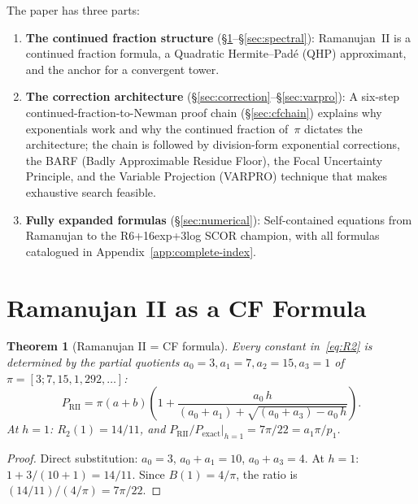 \documentclass[12pt]{article}
\newtheorem{theorem}{Theorem}[section]
\begin{document}
The paper has three parts:
\begin{enumerate}
\item \textbf{The continued fraction structure} (\S\ref{sec:R2}--\S\ref{sec:spectral}): Ramanujan~II is a continued fraction formula, a Quadratic Hermite--Pad\'e (QHP) approximant, and the anchor for a convergent tower.
\item \textbf{The correction architecture} (\S\ref{sec:correction}--\S\ref{sec:varpro}): A six-step continued-fraction-to-Newman proof chain (\S\ref{sec:cfchain}) explains why exponentials work and why the continued fraction of~$\pi$ dictates the architecture; the chain is followed by division-form exponential corrections, the BARF (Badly Approximable Residue Floor), the Focal Uncertainty Principle, and the Variable Projection (VARPRO) technique that makes exhaustive search feasible.
\item \textbf{Fully expanded formulas} (\S\ref{sec:numerical}): Self-contained equations from Ramanujan to the R6+16exp+3log SCOR champion, with all formulas catalogued in Appendix~\ref{app:complete-index}.
\end{enumerate}

\section{Ramanujan II as a CF Formula}\label{sec:R2}

\begin{theorem}[Ramanujan II = CF formula]\label{thm:R2-cf}
Every constant in~\eqref{eq:R2} is determined by the partial quotients
$a_0 = 3, a_1 = 7, a_2 = 15, a_3 = 1$ of $\pi = [3;7,15,1,292,\ldots]$:
\begin{equation}\label{eq:R2-cf}
P_{\text{RII}} = \pi(a{+}b)\!\left(1 + \frac{a_0\,h}{(a_0{+}a_1) + \sqrt{(a_0{+}a_3) - a_0\,h}}\right).
\end{equation}
At $h=1$: $R_2(1) = 14/11$, and $P_{\text{RII}}/P_{\text{exact}}\big|_{h=1} = 7\pi/22 = a_1\pi/p_1$.
\end{theorem}

\begin{proof}
Direct substitution: $a_0 = 3$, $a_0+a_1 = 10$, $a_0+a_3 = 4$.
At $h=1$: $1 + 3/(10+1) = 14/11$. Since $B(1) = 4/\pi$,
the ratio is $(14/11)/(4/\pi) = 7\pi/22$.
\end{proof}
\end{document}
